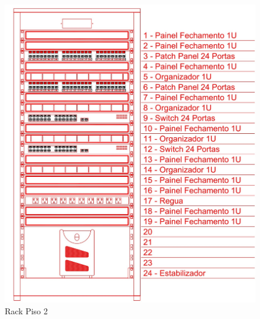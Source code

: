\documentclass[	DIV=calc,%
							paper=a4,%
							fontsize=12pt,%
							onecolumn]{scrartcl}	 					%
\begin{document}
\begin{figure}
	\centering
	\includegraphics[width=\textwidth]{rack_p2}
	\caption{Rack Piso 2}
	\label{rack_p2}
\end{figure}
\FloatBarrier
\end{document}
